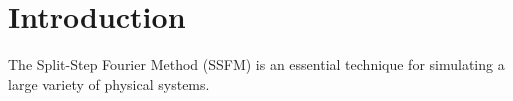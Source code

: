 \chapter*{Introduction}

The Split-Step Fourier Method (SSFM) is an essential technique for simulating a large variety of physical systems.
